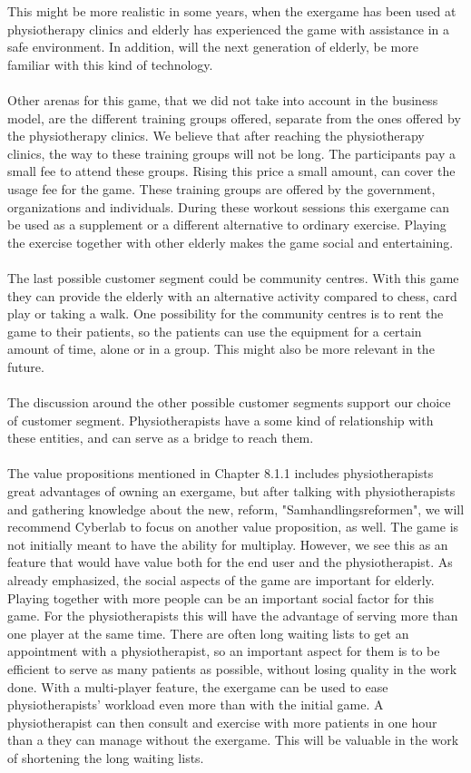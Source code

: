 This might be more realistic in some years, when the exergame has been used at physiotherapy clinics and elderly has experienced the game with assistance in a safe environment. In addition, will the next generation of elderly, be more familiar with this kind of technology.  \\ \\
Other arenas for this game, that we did not take into account in the business model, are the different training groups offered, separate from the ones offered by the physiotherapy clinics. We believe that after reaching the physiotherapy clinics, the way to these training groups will not be long. The participants pay a small fee to attend these groups. Rising this price a small amount, can cover the usage fee for the game. These training groups are offered by the government, organizations and individuals. During these workout sessions this exergame can be used as a supplement or a different alternative to ordinary exercise. Playing the exercise together with other elderly makes the game social and entertaining. \\ \\
The last possible customer segment could be community centres. With this game they can provide the elderly with an alternative activity compared to chess, card play or taking a walk. One possibility for the community centres is to rent the game to their patients, so the patients can use the equipment for a certain amount of time, alone or in a group. This might also be more relevant in the future. \\ \\
The discussion around the other possible customer segments support our choice of customer segment. Physiotherapists have a some kind of relationship with these entities, and can serve as a bridge to reach them. \\ \\
The value propositions mentioned in Chapter 8.1.1 includes physiotherapists great advantages of owning an exergame, but after talking with physiotherapists and gathering knowledge about the new, reform, "Samhandlingsreformen", we will recommend Cyberlab to focus on another value proposition, as well. The game is not initially meant to have the ability for multiplay. However, we see this as an feature that would have value both for the end user and the physiotherapist. As already emphasized, the social aspects of the game are important for elderly. Playing together with more people can be an important social factor for this game. For the physiotherapists this will have the advantage of serving more than one player at the same time. There are often long waiting lists to get an appointment with a physiotherapist, so an important aspect for them is to be efficient to serve as many patients as possible, without losing quality in the work done. With a multi-player feature, the exergame can be used to ease physiotherapists' workload even more than with the initial game. A physiotherapist can then consult and exercise with more patients in one hour than a they can manage without the exergame. This will be valuable in the work of shortening the long waiting lists. \\ \\
